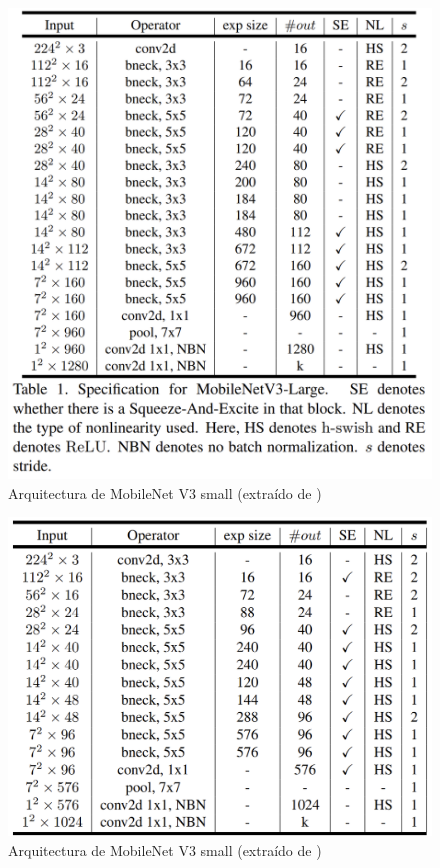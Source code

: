 \begin{figure}[H]
	\label{fig:mbnetlarge}
	\centering
	\includegraphics[scale = 0.25]{imagenes/mbnetv3-large.png}
	\caption{Arquitectura de MobileNet V3 small (extraído de \cite{howard2019searching})}
\end{figure}


\begin{figure}[H]
	\label{fig:mbnetsmall}
	\centering
	\includegraphics[scale = 0.25]{imagenes/mbnetv3-small.png}
	\caption{Arquitectura de MobileNet V3 small (extraído de \cite{howard2019searching})}
\end{figure}

